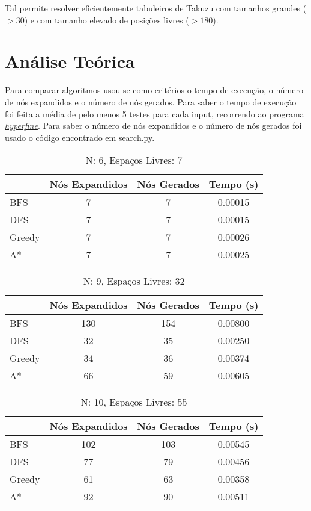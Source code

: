 \documentclass[12pt,a4paper]{article}
\begin{document}
  Tal permite resolver eficientemente tabuleiros de Takuzu com tamanhos grandes ($> 30$) e com tamanho elevado de posições livres ($>180$).
  

  \section{Análise Teórica}

  Para comparar algoritmos usou-se como critérios o tempo de execução, o número de nós expandidos e o número de nós gerados.
  Para saber o tempo de execução foi feita a média de pelo menos 5 testes para cada input, recorrendo ao programa \href{https://github.com/sharkdp/hyperfine}{\textit{hyperfine}}.
  Para saber o número de nós expandidos e o número de nós gerados foi usado o código encontrado em search.py.

  \begin{table}[H]
    \caption{N: 6, Espaços Livres: 7}
    \label{tab:my-table}
    \centering
    \begin{tabular}{lccc}
      & Nós Expandidos & Nós Gerados & Tempo (s) \\
      \hline
      BFS    &  7 &  7 & 0.00015 \\
      DFS    &  7 &  7 & 0.00015 \\
      Greedy &  7 &  7 & 0.00026 \\
      A*     &  7 &  7 & 0.00025 \\
    \hline
    \end{tabular}
  \end{table}

  \begin{table}[H]
    \caption{N: 9, Espaços Livres: 32}
    \label{tab:my-table1}
    \centering
    \begin{tabular}{lccc}
      & Nós Expandidos & Nós Gerados & Tempo (s) \\
      \hline
      BFS     & 130 & 154 & 0.00800 \\
      DFS     &  32 &  35 & 0.00250 \\
      Greedy  &  34 &  36 & 0.00374 \\
      A*      &  66 &  59 & 0.00605 \\
    \hline
    \end{tabular}
  \end{table}

  \begin{table}[H]
    \caption{N: 10, Espaços Livres: 55}
    \label{tab:my-table2}
    \centering
    \begin{tabular}{lccc}
      & Nós Expandidos & Nós Gerados & Tempo (s) \\
      \hline
      BFS    & 102 & 103  & 0.00545 \\
      DFS    &  77 &  79  & 0.00456 \\
      Greedy &  61 &  63  & 0.00358 \\
      A*     &  92 &  90  & 0.00511 \\
    \hline
    \end{tabular}
  \end{table}
\end{document}
